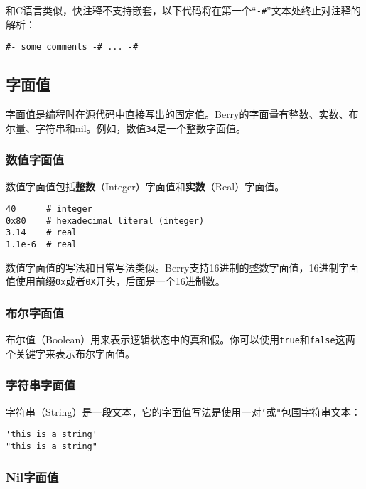 和C语言类似，快注释不支持嵌套，以下代码将在第一个``\texttt{-\#}''文本处终止对注释的解析：
\begin{lstlisting}[language=berry, numbers=none]
#- some comments -# ... -#
\end{lstlisting}

\subsection{字面值}

字面值是编程时在源代码中直接写出的固定值。Berry的字面量有整数、实数、布尔量、字符串和nil。例如，数值\texttt{34}是一个整数字面值。

\subsubsection{数值字面值}

数值字面值包括\textbf{整数}（Integer）字面值和\textbf{实数}（Real）字面值。
\begin{lstlisting}[language=berry, numbers=none]
40      # integer
0x80    # hexadecimal literal (integer)
3.14    # real
1.1e-6  # real
\end{lstlisting}

数值字面值的写法和日常写法类似。Berry支持16进制的整数字面值，16进制字面值使用前缀\texttt{0x}或者\texttt{0X}开头，后面是一个16进制数。

\subsubsection{布尔字面值}

布尔值（Boolean）用来表示逻辑状态中的真和假。你可以使用\texttt{true}和\texttt{false}这两个关键字来表示布尔字面值。

\subsubsection{字符串字面值}

字符串（String）是一段文本，它的字面值写法是使用一对\texttt{'}或\texttt{"}包围字符串文本：
\begin{lstlisting}[language=berry, numbers=none]
'this is a string'
"this is a string"
\end{lstlisting}

\subsubsection{Nil字面值}

